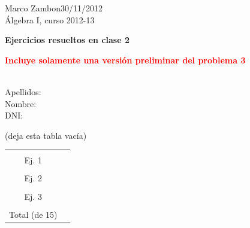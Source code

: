 \documentclass[12pt,a4paper]{report}
\theoremstyle{definition}
\begin{document}
\noindent
{\sffamily\large  
Marco Zambon\hfill     30/11/2012\\\'Algebra I, curso 2012-13}
 

\begin{center}\bfseries\large\textsf{Ejercicios resueltos en clase 2    \vspace{-2mm}}
\end{center}

\textcolor{red}{\bfseries\Huge\textsf{Incluye solamente una versi\'on preliminar del problema 3 }}
 

\noindent
\hrulefill{}\\

\noindent
{\sffamily\large Apellidos:\\
Nombre:\\
DNI: 
}


 
\begin{center}{\sffamily (deja esta tabla vac\'ia)}
\end{center}
\vspace*{-5mm}
 

\begin{table}[htdp]
\begin{center}
\begin{tabular}{|c|p{2cm} |}
\hline
&\\[-0.2cm]
Ej. 1  &\\[0.2cm]
\hline
&\\[-0.2cm]
Ej. 2  &\\[0.2cm]
\hline
&\\[-0.2cm]
Ej. 3  &\\[0.2cm]
\hline
\hline
&\\[-0.2cm]
Total (de 15) & \\[0.2cm]
\hline
\end{tabular}
\end{center}
\label{default}
\end{table}
\vspace*{-5mm}
\end{document}
